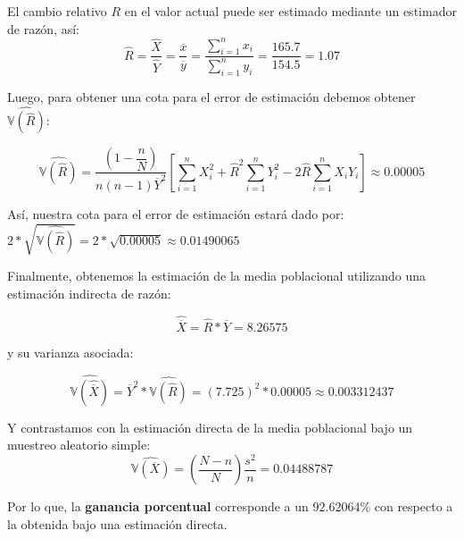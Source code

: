 \noaddpoints
{}
\begin{solution}
El cambio relativo $R$ en el valor actual puede ser estimado mediante un estimador de razón, así:
$$\hat{R}=\dfrac{\hat{X}}{\hat{Y}}=\dfrac{\overline{x}}{\overline{y}}=\dfrac{\sum_{i=1}^{n} x_i}{\sum_{i=1}^{n} y_i}=\dfrac{165.7}{154.5}=1.07$$

Luego, para obtener una cota para el error de estimación debemos obtener $\widehat{\mathbb{V}(\hat{R})}$:

$$\widehat{\mathbb{V}(\hat{R})}=\dfrac{(1-\dfrac{n}{N})}{n(n-1)\overline{Y}^2}\left[ \sum_{i=1}^{n} X_{i}^2 + \hat{R}^2 \sum_{i=1}^{n} Y_{i}^2-2\hat{R} \sum_{i=1}^{n} X_i Y_i \right]\approx 0.00005$$

Así, nuestra cota para el error de estimación estará dado por: $2*\sqrt{\widehat{\mathbb{V}(\hat{R})}}=2*\sqrt{0.00005}\approx 0.01490065$

Finalmente, obtenemos la estimación de la media poblacional utilizando una estimación indirecta de razón:

$$\hat{\overline{X}}=\hat{R}*\overline{Y}=8.26575$$

y su varianza asociada:

$$\widehat{\mathbb{V}(\hat{\overline{X}})}=\overline{Y}^2 * \widehat{\mathbb{V}(\hat{R})}=(7.725)^2*0.00005\approx 0.003312437$$

Y contrastamos con la estimación directa de la media poblacional bajo un muestreo aleatorio simple:
$$\widehat{\mathbb{V}(\overline{X})}=\left(\dfrac{N-n}{N}\right)\dfrac{s^2}{n}=0.04488787$$

Por lo que, la \textbf{ganancia porcentual} corresponde a un $92.62064\%$ con respecto a la obtenida bajo una estimación directa.
\end{solution}